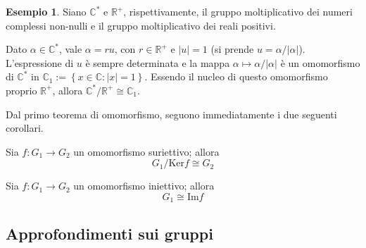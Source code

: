 \documentclass[11pt, a4paper]{scrartcl}
\theoremstyle{definition}
\newtheorem{esempio}{Esempio}
\numberwithin{esempio}{section}
\theoremstyle{definition}
\numberwithin{obs}{section}
\numberwithin{nota}{section}
\numberwithin{equation}{subsection}
\begin{document}
\begin{esempio}
Siano $\mathbb{C}^*$ e $\mathbb{R}^+$, rispettivamente, il gruppo moltiplicativo dei numeri complessi non-nulli e il gruppo moltiplicativo dei reali positivi.

Dato $\alpha \in \mathbb{C}^*$, vale $\alpha  = ru$, con $r \in \mathbb{R}^+$ e $\lvert u \rvert = 1$ (si prende $u = \alpha  / \lvert \alpha  \rvert $). 
L'espressione di $u$ \`e sempre determinata e la mappa $\alpha \mapsto \alpha / \lvert \alpha  \rvert $ \`e un omomorfismo di $\mathbb{C}^*$ in $\mathbb{C}_1 := \left\{ x \in \mathbb{C} : \lvert x \rvert = 1 \right\} $.
Essendo il nucleo di questo omomorfismo proprio $\mathbb{R}^+$, allora $\mathbb{C}^* / \mathbb{R}^+ \cong \mathbb{C}_1$.
\end{esempio}
\noindent Dal primo teorema di omomorfismo, seguono immediatamente i due seguenti corollari.
\begin{corollario}
	{}{}
	Sia $f:G_1\to G_2$ un omomorfismo suriettivo; allora 
	\[
	G_1 / \mathrm{Ker} f \cong G_2
	\] 
\end{corollario}
\begin{corollario}
	{}{}
	Sia $f:G_1\to G_2$ un omomorfismo iniettivo; allora
	\[
	G_1 \cong \mathrm{Im} f
	\] 
\end{corollario}
\subsection{Approfondimenti sui gruppi}
\end{document}
